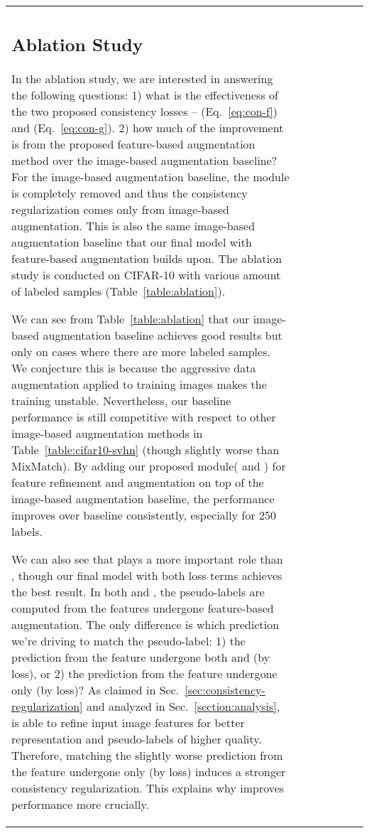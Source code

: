 \documentclass[runningheads]{llncs}
\begin{document}
\begin{table*}[t]
{\begin{tabular}{@{\extracolsep{4pt}}lcccccc@{}}
{\subsection{Ablation Study}

In the ablation study, we are interested in answering the following questions:
1) what is the effectiveness of the two proposed consistency losses --  (Eq.~\ref{eq:con-f}) and  (Eq.~\ref{eq:con-g}).
2) how much of the improvement is from the proposed feature-based augmentation method over the image-based augmentation baseline?
For the image-based augmentation baseline, the  module is completely removed and thus the consistency regularization comes only from image-based augmentation.
This is also the same image-based augmentation baseline that our final model with feature-based augmentation builds upon.
The ablation study is conducted on CIFAR-10 with various amount of labeled samples (Table~\ref{table:ablation}).

We can see from Table~\ref{table:ablation} that our image-based augmentation baseline achieves good results but only on cases where there are more labeled samples.
We conjecture this is because the aggressive data augmentation applied to training images makes the training unstable.
Nevertheless, our baseline performance is still competitive with respect to other image-based augmentation methods in Table~\ref{table:cifar10-svhn} (though slightly worse than MixMatch).
By adding our proposed  module( and ) for feature refinement and augmentation on top of the image-based augmentation baseline, the performance improves over baseline consistently, especially for 250 labels. 

We can also see that  plays a more important role than , though our final model with both loss terms achieves the best result.
In both  and , the pseudo-labels are computed from the features undergone feature-based augmentation.
The only difference is which prediction we're driving to match the pseudo-label: 1) the prediction from the feature undergone both  and  (by  loss), or 2) the prediction from the feature undergone only  (by  loss)?
As claimed in Sec.~\ref{sec:consistency-regularization} and analyzed in Sec.~\ref{section:analysis},  is able to refine input image features for better representation and pseudo-labels of higher quality.
Therefore, matching the slightly worse prediction from the feature undergone only  (by  loss) induces a stronger consistency regularization.
This explains why  improves performance more crucially.

}
\end{tabular}}
\end{table*}
\end{document}
